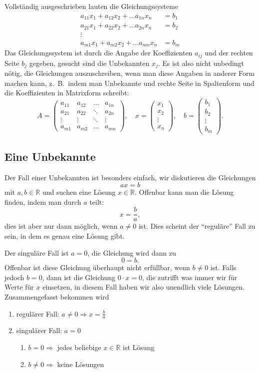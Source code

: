 Vollständig ausgeschrieben lauten die Gleichungssysteme
\begin{align*}
a_{11}x_1+a_{12}x_2+\dots a_{1n}x_n&=b_1\\
a_{21}x_1+a_{22}x_2+\dots a_{2n}x_n&=b_2\\
\vdots\\
a_{m1}x_1+a_{m2}x_2+\dots a_{mn}x_n&=b_m
\end{align*}
Das Gleichungssystem ist durch die Angabe der Koeffizienten $a_{ij}$
und der rechten Seite $b_j$ gegeben, gesucht sind die Unbekannten $x_j$.
Es ist also nicht unbedingt nötig, die Gleichungen auszuschreiben,
wenn man diese Angaben in anderer Form machen kann, z.~B.~indem man
Unbekannte und rechte Seite in Spaltenform und die Koeffizienten in
Matrixform schreibt:
\[
A=\begin{pmatrix}
a_{11}&a_{12}&\dots &a_{1n}\\
a_{21}&a_{22}&\ddots&a_{2n}\\
\vdots&\vdots&\ddots&\vdots\\
a_{m1}&a_{m2}&\dots&a_{mn}
\end{pmatrix}
,\quad
x=\begin{pmatrix}
x_1\\x_2\\\vdots\\x_n
\end{pmatrix},
\quad
b=\begin{pmatrix}
b_1\\b_2\\\vdots\\b_m
\end{pmatrix}.
\]

\subsection{Eine Unbekannte}
Der Fall einer Unbekannten ist besonders einfach, wir diskutieren die
Gleichungen
\[
ax=b
\]
mit $a,b\in\mathbb R$ und suchen eine Lösung $x\in\mathbb R$.
Offenbar kann man die Lösung finden, indem man durch $a$ teilt:
\[
x=\frac{b}{a},
\]
dies ist aber nur dann möglich, wenn $a\ne 0$ ist.
Dies scheint
der ``reguläre'' Fall zu sein, in dem es genau eine Lösung gibt.

Der singuläre Fall ist $a=0$, die Gleichung wird dann zu 
\[
0=b.
\]
Offenbar ist diese Gleichung überhaupt nicht erfüllbar, wenn $b\ne 0$
ist.
Falls jedoch $b=0$, dann ist die Gleichung $0\cdot x=0$, die
zutrifft was immer wir für Werte für $x$ einsetzen, in diesem
Fall haben wir also unendlich viele Lösungen.
Zusammengefasst
bekommen wird
\begin{enumerate}
\item regulärer Fall: $a\ne 0\Rightarrow x=\frac{b}{a}$
\item singulärer Fall: $a=0$
\begin{enumerate}
\item $b=0\Rightarrow$ jedes beliebige $x\in\mathbb R$ ist Lösung
\item $b\ne0\Rightarrow$ keine Lösungen
\end{enumerate}
\end{enumerate}

